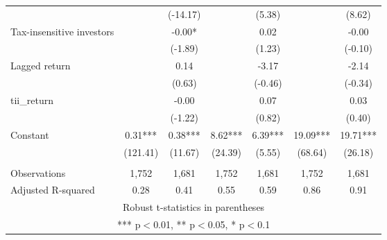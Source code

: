 \documentclass[]{article}
\begin{document}
\begin{tabular}{lcccccc}
 &  & (-14.17) &  & (5.38) &  & (8.62) \\
Tax-insensitive investors &  & -0.00* &  & 0.02 &  & -0.00 \\
 &  & (-1.89) &  & (1.23) &  & (-0.10) \\
Lagged return &  & 0.14 &  & -3.17 &  & -2.14 \\
 &  & (0.63) &  & (-0.46) &  & (-0.34) \\
tii\_return &  & -0.00 &  & 0.07 &  & 0.03 \\
 &  & (-1.22) &  & (0.82) &  & (0.40) \\
Constant & 0.31*** & 0.38*** & 8.62*** & 6.39*** & 19.09*** & 19.71*** \\
 & (121.41) & (11.67) & (24.39) & (5.55) & (68.64) & (26.18) \\
 &  &  &  &  &  &  \\
Observations & 1,752 & 1,681 & 1,752 & 1,681 & 1,752 & 1,681 \\
 Adjusted R-squared & 0.28 & 0.41 & 0.55 & 0.59 & 0.86 & 0.91 \\ \hline
\multicolumn{7}{c}{ Robust t-statistics in parentheses} \\
\multicolumn{7}{c}{ *** p$<$0.01, ** p$<$0.05, * p$<$0.1} \\
\end{tabular}
\end{document}
